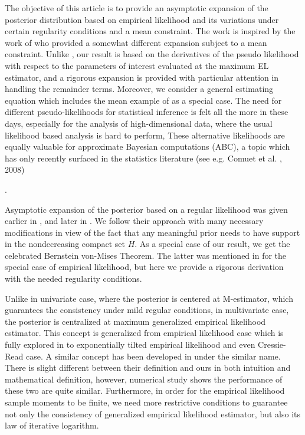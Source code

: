 \documentclass[oneside,english]{amsbook}
\numberwithin{section}{chapter}
\numberwithin{equation}{section}
\numberwithin{figure}{section}
\theoremstyle{plain}
\theoremstyle{plain}
\theoremstyle{definition}
\theoremstyle{plain}
\theoremstyle{plain}
\theoremstyle{remark}
\theoremstyle{definition}
\theoremstyle{definition}
\begin{document}
The objective of this article is to provide an asymptotic expansion
of the posterior distribution based on empirical likelihood and its
variations under certain regularity conditions and a mean constraint.
The work is inspired by the work of \citet{fang2006empirical} who
provided a somewhat different expansion subject to a mean constraint.
Unlike \citet{fang2005expected,fang2006empirical}, our result is
based on the derivatives of the pseudo likelihood with respect to
the parameters of interest evaluated at the maximum EL estimator,
and a rigorous expansion is provided with particular attention in
handling the remainder terms. Moreover, we consider a general estimating
equation which includes the mean example of \citet{fang2006empirical}
as a special case. The need for different pseudo-likelihoods for statistical
inference is felt all the more in these days, especially for the analysis
of high-dimensional data, where the usual likelihood based analysis
is hard to perform, These alternative likelihoods are equally valuable
for approximate Bayesian computations (ABC), a topic which has only
recently surfaced in the statistics literature (see e.g. Comuet et
al. , 2008)%

.

Asymptotic expansion of the posterior based on a regular likelihood
was given earlier in \citet{johnson1970asymptotic}, and later in
\citet{ghosh1982expansions}. We follow their approach with many necessary
modifications in view of the fact that any meaningful prior needs
to have support in the nondecreasing compact set $H$. As a special
case of our result, we get the celebrated Bernstein von-Mises Theorem.
The latter was mentioned in \citet{lazar2003bayesian} for the special
case of empirical likelihood, but here we provide a rigorous  derivation
with the needed regularity conditions. 

Unlike in univariate case, where the posterior is centered at M-estimator,
which guarantees the consistency under mild regular conditions, in
multivariate case, the posterior is centralized at maximum generalized
empirical likelihood estimator. This concept is generalized from empirical
likelihood case which is fully explored in \citet{qin1994empirical}
to exponentially tilted empirical likelihood and even Cressie-Read
case. A similar concept has been developed in \citet{newey2004higher}
under the similar name. There is slight different between their definition
and ours in both intuition and mathematical definition, however, numerical
study shows the performance of these two are quite similar. Furthermore,
in order for the empirical likelihood sample moments to be finite,
we need more restrictive conditions to guarantee not only the consistency
of generalized empirical likelihood estimator, but also its law of
iterative logarithm. 
\end{document}
